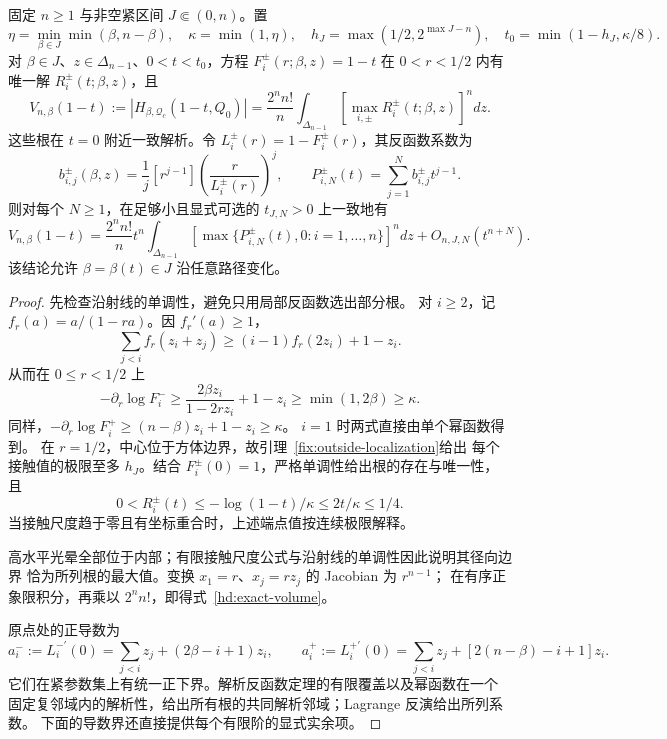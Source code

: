 \begin{theorem}[任意维径向根与全阶统一截断]\label{hd:all-orders}
固定 $n\ge1$ 与非空紧区间 $J\Subset(0,n)$。置
\[
 \eta=\min_{\beta\in J}\min(\beta,n-\beta),\quad
 \kappa=\min(1,\eta),\quad h_J=\max(1/2,2^{\max J-n}),\quad
 t_0=\min(1-h_J,\kappa/8).
\]
对 $\beta\in J$、$z\in\Delta_{n-1}$、$0<t<t_0$，方程
$F_i^\pm(r;\beta,z)=1-t$ 在 $0<r<1/2$ 内有唯一解 $R_i^\pm(t;\beta,z)$，且
\begin{equation}\label{hd:exact-volume}
 V_{n,\beta}(1-t):=|H_{\beta,\mathcal Q_c}(1-t,Q_0)|
 =\frac{2^nn!}{n}\int_{\Delta_{n-1}}
       \left[\max_{i,\pm}R_i^\pm(t;\beta,z)\right]^n dz.
\end{equation}
这些根在 $t=0$ 附近一致解析。令 $L_i^\pm(r)=1-F_i^\pm(r)$，其反函数系数为
\[
 b_{i,j}^\pm(\beta,z)=\frac1j[r^{j-1}]
               \left(\frac r{L_i^\pm(r)}\right)^j,
 \qquad P_{i,N}^\pm(t)=\sum_{j=1}^Nb_{i,j}^\pm t^{j-1}.
\]
则对每个 $N\ge1$，在足够小且显式可选的 $t_{J,N}>0$ 上一致地有
\begin{equation}\label{hd:uniform-truncation}
 V_{n,\beta}(1-t)=\frac{2^nn!}{n}t^n
 \int_{\Delta_{n-1}}[\max\{P_{i,N}^\pm(t),0:i=1,\ldots,n\}]^n dz
 +O_{n,J,N}(t^{n+N}).
\end{equation}
该结论允许 $\beta=\beta(t)\in J$ 沿任意路径变化。
\end{theorem}
\begin{proof}
先检查沿射线的单调性，避免只用局部反函数选出部分根。
对 $i\ge2$，记 $f_r(a)=a/(1-ra)$。因 $f_r'(a)\ge1$，
\[
 \sum_{j<i}f_r(z_i+z_j)\ge(i-1)f_r(2z_i)+1-z_i.
\]
从而在 $0\le r<1/2$ 上
\[
 -\partial_r\log F_i^-\ge
 \frac{2\beta z_i}{1-2rz_i}+1-z_i\ge\min(1,2\beta)\ge\kappa.
\]
同样，$-\partial_r\log F_i^+\ge(n-\beta)z_i+1-z_i\ge\kappa$。
$i=1$ 时两式直接由单个幂函数得到。
在 $r=1/2$，中心位于方体边界，故引理~\ref{fix:outside-localization}给出
每个接触值的极限至多 $h_J$。结合 $F_i^\pm(0)=1$，严格单调性给出根的存在与唯一性，且
\[
 0<R_i^\pm(t)\le-\log(1-t)/\kappa\le2t/\kappa\le1/4.
\]
当接触尺度趋于零且有坐标重合时，上述端点值按连续极限解释。

高水平光晕全部位于内部；有限接触尺度公式与沿射线的单调性因此说明其径向边界
恰为所列根的最大值。变换 $x_1=r$、$x_j=rz_j$ 的 Jacobian 为 $r^{n-1}$；
在有序正象限积分，再乘以 $2^nn!$，即得式~\eqref{hd:exact-volume}。

原点处的正导数为
\[
 a_i^-:=L_i^{-\prime}(0)=\sum_{j<i}z_j+(2\beta-i+1)z_i,\qquad
 a_i^+:=L_i^{+\prime}(0)=\sum_{j<i}z_j+[2(n-\beta)-i+1]z_i.
\]
它们在紧参数集上有统一正下界。解析反函数定理的有限覆盖以及幂函数在一个
固定复邻域内的解析性，给出所有根的共同解析邻域；Lagrange 反演给出所列系数。
下面的导数界还直接提供每个有限阶的显式实余项。
\end{proof}


